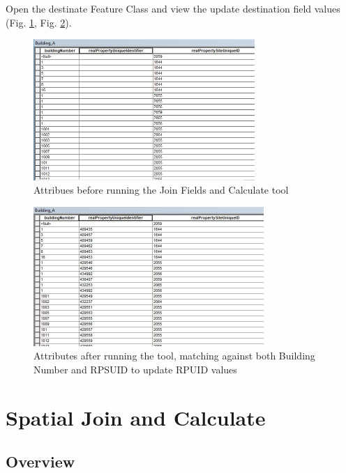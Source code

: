 \documentclass[openany]{book}
\theoremstyle{definition}
\theoremstyle{definition}
\theoremstyle{definition}
\theoremstyle{remark}
\begin{document}
Open the destinate Feature Class and view the update destination field
values (Fig. \ref{fig:jcbefore}, Fig. \ref{fig:jcafter}).

\begin{figure}[H]

{\centering \includegraphics[width=3.3in,]{figures/joinCalc-before} 

}

\caption{Attribues before running the Join Fields and Calculate tool}\label{fig:jcbefore}
\end{figure}

\begin{figure}[H]

{\centering \includegraphics[width=3.44in,]{figures/joinCalc-results} 

}

\caption{Attributes after running the tool, matching against both Building Number and RPSUID to update RPUID values}\label{fig:jcafter}
\end{figure}

\hypertarget{spatjoinCalc}{\chapter{Spatial Join and
Calculate}\label{spatjoinCalc}}

\section{Overview}\label{overview-2}
\end{document}

